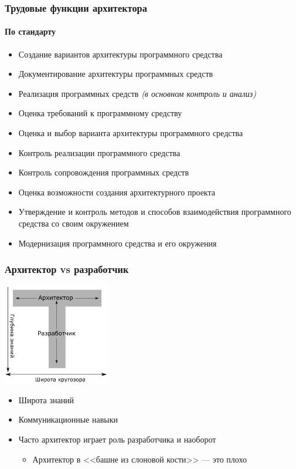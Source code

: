 \documentclass[xetex,mathserif,serif]{beamer}
\begin{document}
    \begin{frame}
        \frametitle{Трудовые функции архитектора}
        \framesubtitle{По стандарту}
        \begin{itemize}
            \item Создание вариантов архитектуры программного средства
            \item Документирование архитектуры программных средств
            \item Реализация программных средств \textit{(в основном контроль и анализ)}
            \item Оценка требований к программному средству
            \item Оценка и выбор варианта архитектуры программного средства
            \item Контроль реализации программного средства
            \item Контроль сопровождения программных средств
            \item Оценка возможности создания архитектурного проекта
            \item Утверждение и контроль методов и способов взаимодействия программного средства со своим окружением
            \item Модернизация программного средства и его окружения
        \end{itemize}
    \end{frame}

    \begin{frame}
        \frametitle{Архитектор vs разработчик}
        \begin{center}
            \includegraphics[width=0.35\textwidth]{architectVsDeveloper.png}
        \end{center}
        \begin{itemize}
            \item Широта знаний
            \item Коммуникационные навыки
            \item Часто архитектор играет роль разработчика и наоборот
            \begin{itemize}
                \item Архитектор в <<башне из слоновой кости>> --- это плохо
            \end{itemize}
        \end{itemize}
    \end{frame}
\end{document}
